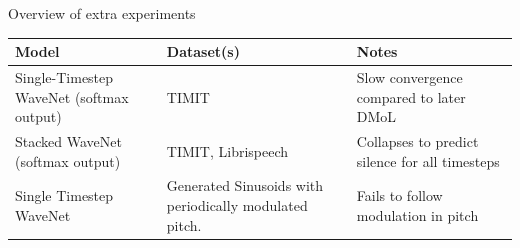\documentclass[
  ignorenonframetext,
  aspectratio=169,
]{beamer}
\begin{document}
\begin{frame}{Overview of extra experiments}
\protect\hypertarget{overview-of-extra-experiments}{}
\begin{longtable}[]{@{}lll@{}}
\toprule
\begin{minipage}[b]{0.26\columnwidth}\raggedright
Model\strut
\end{minipage} & \begin{minipage}[b]{0.35\columnwidth}\raggedright
Dataset(s)\strut
\end{minipage} & \begin{minipage}[b]{0.30\columnwidth}\raggedright
Notes\strut
\end{minipage}\tabularnewline
\midrule
\endhead
\begin{minipage}[t]{0.26\columnwidth}\raggedright
Single-Timestep WaveNet (softmax output)\strut
\end{minipage} & \begin{minipage}[t]{0.35\columnwidth}\raggedright
TIMIT\strut
\end{minipage} & \begin{minipage}[t]{0.30\columnwidth}\raggedright
Slow convergence compared to later DMoL\strut
\end{minipage}\tabularnewline
\begin{minipage}[t]{0.26\columnwidth}\raggedright
Stacked WaveNet (softmax output)\strut
\end{minipage} & \begin{minipage}[t]{0.35\columnwidth}\raggedright
TIMIT, Librispeech\strut
\end{minipage} & \begin{minipage}[t]{0.30\columnwidth}\raggedright
Collapses to predict silence for all timesteps\strut
\end{minipage}\tabularnewline
\begin{minipage}[t]{0.26\columnwidth}\raggedright
Single Timestep WaveNet\strut
\end{minipage} & \begin{minipage}[t]{0.35\columnwidth}\raggedright
Generated Sinusoids with periodically modulated pitch.\strut
\end{minipage} & \begin{minipage}[t]{0.30\columnwidth}\raggedright
Fails to follow modulation in pitch\strut
\end{minipage}\tabularnewline
\bottomrule
\end{longtable}
\end{frame}
\end{document}
